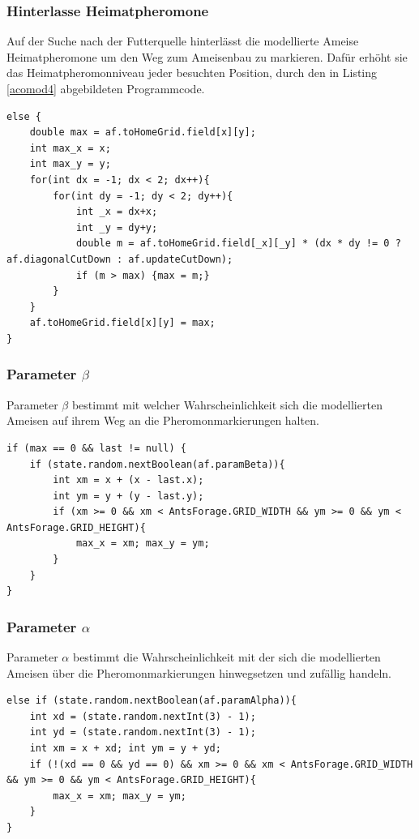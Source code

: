 \documentclass[a4paper, 11pt]{article}
\begin{document}
\subsubsection{Hinterlasse Heimatpheromone}
Auf der Suche nach der Futterquelle hinterlässt die modellierte Ameise Heimatpheromone um den Weg zum Ameisenbau zu markieren. Dafür erhöht sie das Heimatpheromonniveau jeder besuchten Position, durch den in Listing \ref{acomod4} abgebildeten Programmcode. \newline
\begin{lstlisting}[caption= Ameisen: Hinterlasse Heimatpheromone,label = acomod4]
else {
	double max = af.toHomeGrid.field[x][y];
	int max_x = x;
	int max_y = y;
	for(int dx = -1; dx < 2; dx++){
		for(int dy = -1; dy < 2; dy++){
			int _x = dx+x;
			int _y = dy+y;
			double m = af.toHomeGrid.field[_x][_y] * (dx * dy != 0 ? af.diagonalCutDown : af.updateCutDown);
			if (m > max) {max = m;}
		}
	}
	af.toHomeGrid.field[x][y] = max;
}
\end{lstlisting}
\subsubsection{Parameter $\beta$}
Parameter $\beta$ bestimmt mit welcher Wahrscheinlichkeit sich die modellierten Ameisen auf ihrem Weg an die Pheromonmarkierungen halten. \newline
\begin{lstlisting}[caption= Ameisen: Parameter beta,label = acomod5]
if (max == 0 && last != null) {
	if (state.random.nextBoolean(af.paramBeta)){
		int xm = x + (x - last.x);
		int ym = y + (y - last.y);
		if (xm >= 0 && xm < AntsForage.GRID_WIDTH && ym >= 0 && ym < AntsForage.GRID_HEIGHT){ 
			max_x = xm; max_y = ym; 
		}
	}
}
\end{lstlisting}
\subsubsection{Parameter $\alpha$}
Parameter $\alpha$ bestimmt die Wahrscheinlichkeit mit der sich die modellierten Ameisen über die Pheromonmarkierungen hinwegsetzen und zufällig handeln.\newline
\begin{lstlisting}[caption= Ameisen: Parameter alpha,label = acomod6]
else if (state.random.nextBoolean(af.paramAlpha)){
	int xd = (state.random.nextInt(3) - 1); 
	int yd = (state.random.nextInt(3) - 1);
	int xm = x + xd; int ym = y + yd;
	if (!(xd == 0 && yd == 0) && xm >= 0 && xm < AntsForage.GRID_WIDTH && ym >= 0 && ym < AntsForage.GRID_HEIGHT){ 
		max_x = xm;	max_y = ym; 
	}
}
\end{lstlisting}
\end{document}
